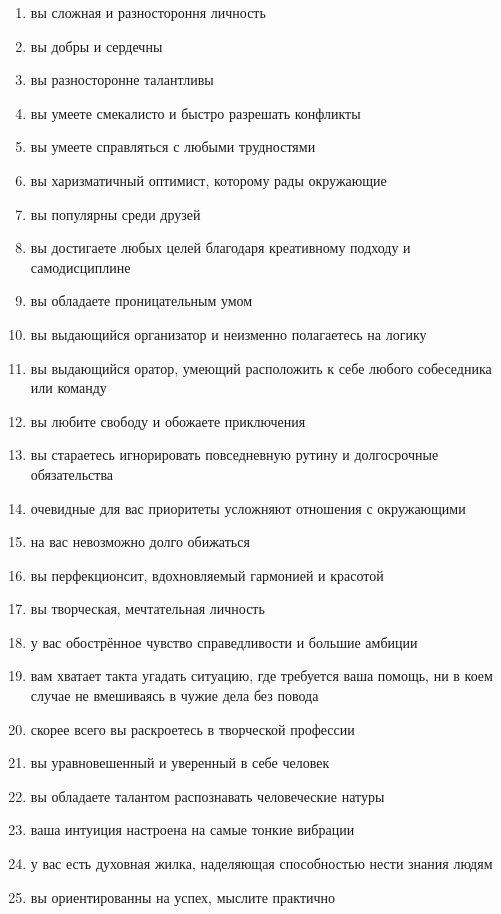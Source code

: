 \documentclass[a4paper, 12pt]{article}
\begin{document}
\begin{multicols*}{2}
\begin{enumerate}
        \item вы сложная и разностороння личность
        \item вы добры и сердечны
        \item вы разносторонне талантливы
        \item вы умеете смекалисто и быстро разрешать конфликты
        \item вы умеете справляться с любыми трудностями
        \item вы харизматичный оптимист, которому рады окружающие
        \item вы популярны среди друзей
        \item вы достигаете любых целей благодаря креативному подходу и самодисциплине
        \item вы обладаете проницательным умом
        \item вы выдающийся организатор и неизменно полагаетесь на логику
        \item вы выдающийся оратор, умеющий расположить к себе любого собеседника или команду
        \item вы любите свободу и обожаете приключения
        \item вы стараетесь игнорировать повседневную рутину и долгосрочные обязательства
        \item очевидные для вас приоритеты усложняют отношения с окружающими
        \item на вас невозможно долго обижаться
        \item вы перфекционсит, вдохновляемый гармонией и красотой
        \item вы творческая, мечтательная личность
        \item у вас обострённое чувство справедливости и большие амбиции
        \item вам хватает такта угадать ситуацию, где требуется ваша помощь, ни в коем случае не вмешиваясь в чужие дела без повода
        \item скорее всего вы раскроетесь в творческой профессии
        \item вы уравновешенный и уверенный в себе человек
        \item вы обладаете талантом распознавать человеческие натуры
        \item ваша интуиция настроена на самые тонкие вибрации
        \item у вас есть духовная жилка, наделяющая способностью нести знания людям
        \item вы ориентированны на успех, мыслите практично

\end{enumerate}
\end{multicols*}
\end{document}

